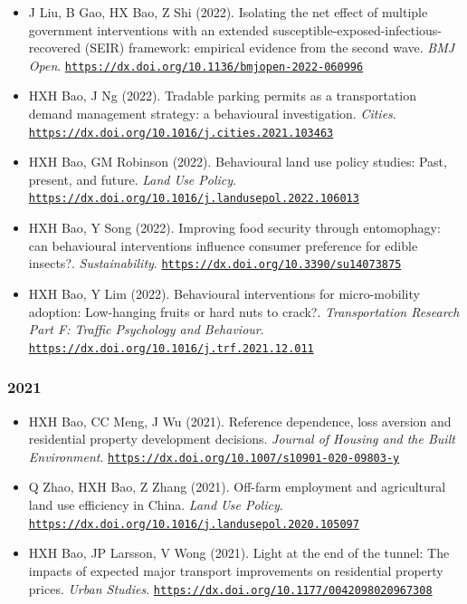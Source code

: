 \documentclass[11pt,a4paper]{article}
\providecommand{\tightlist}{%
  \setlength{\itemsep}{1pt}\setlength{\parskip}{0pt}}
\begin{document}
\begin{itemize}
\tightlist
\item
  J Liu, B Gao, HX Bao, Z Shi (2022). Isolating the net effect of
  multiple government interventions with an extended
  susceptible-exposed-infectious-recovered (SEIR) framework: empirical
  evidence from the second wave. \emph{BMJ Open}.
  \href{https://dx.doi.org/10.1136/bmjopen-2022-060996}{\nolinkurl{https://dx.doi.org/10.1136/bmjopen-2022-060996}}
\item
  HXH Bao, J Ng (2022). Tradable parking permits as a transportation
  demand management strategy: a behavioural investigation.
  \emph{Cities}.
  \href{https://dx.doi.org/10.1016/j.cities.2021.103463}{\nolinkurl{https://dx.doi.org/10.1016/j.cities.2021.103463}}
\item
  HXH Bao, GM Robinson (2022). Behavioural land use policy studies:
  Past, present, and future. \emph{Land Use Policy}.
  \href{https://dx.doi.org/10.1016/j.landusepol.2022.106013}{\nolinkurl{https://dx.doi.org/10.1016/j.landusepol.2022.106013}}
\item
  HXH Bao, Y Song (2022). Improving food security through entomophagy:
  can behavioural interventions influence consumer preference for edible
  insects?. \emph{Sustainability}.
  \href{https://dx.doi.org/10.3390/su14073875}{\nolinkurl{https://dx.doi.org/10.3390/su14073875}}
\item
  HXH Bao, Y Lim (2022). Behavioural interventions for micro-mobility
  adoption: Low-hanging fruits or hard nuts to crack?.
  \emph{Transportation Research Part F: Traffic Psychology and
  Behaviour}.
  \href{https://dx.doi.org/10.1016/j.trf.2021.12.011}{\nolinkurl{https://dx.doi.org/10.1016/j.trf.2021.12.011}}
\end{itemize}

\subsubsection{2021}\label{section-5}

\begin{itemize}
\tightlist
\item
  HXH Bao, CC Meng, J Wu (2021). Reference dependence, loss aversion and
  residential property development decisions. \emph{Journal of Housing
  and the Built Environment}.
  \href{https://dx.doi.org/10.1007/s10901-020-09803-y}{\nolinkurl{https://dx.doi.org/10.1007/s10901-020-09803-y}}
\item
  Q Zhao, HXH Bao, Z Zhang (2021). Off-farm employment and agricultural
  land use efficiency in China. \emph{Land Use Policy}.
  \href{https://dx.doi.org/10.1016/j.landusepol.2020.105097}{\nolinkurl{https://dx.doi.org/10.1016/j.landusepol.2020.105097}}
\item
  HXH Bao, JP Larsson, V Wong (2021). Light at the end of the tunnel:
  The impacts of expected major transport improvements on residential
  property prices. \emph{Urban Studies}.
  \href{https://dx.doi.org/10.1177/0042098020967308}{\nolinkurl{https://dx.doi.org/10.1177/0042098020967308}}
\end{itemize}
\end{document}
